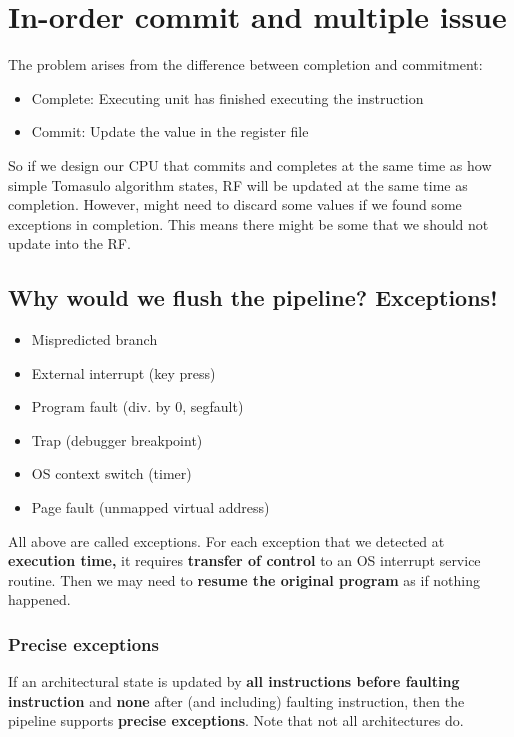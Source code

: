 \documentclass[letterpaper,12pt]{article}
\begin{document}
\section{In-order commit and multiple issue}

The problem arises from the difference between completion and commitment:
\begin{itemize}
    \item Complete: Executing unit has finished executing the instruction
    \item Commit: Update the value in the register file
\end{itemize}

So if we design our CPU that commits and completes at the same time as how simple Tomasulo algorithm states, RF will be updated at the same time as completion. However, might need to discard some values if we found some exceptions in completion. This means there might be some that we should not update into the RF.

\subsection{Why would we flush the pipeline? Exceptions!}
\begin{itemize}
    \item Mispredicted branch
    \item External interrupt (key press)
    \item Program fault (div. by 0, segfault)
    \item Trap (debugger breakpoint)
    \item OS context switch (timer)
    \item Page fault (unmapped virtual address)
\end{itemize}

All above are called exceptions. For each exception that we detected at \textbf{execution time,} it requires \textbf{transfer of control} to an OS interrupt service routine. Then we may need to \textbf{resume the original program} as if nothing happened.

\subsubsection{Precise exceptions}

If an architectural state is updated by \textbf{all instructions before faulting instruction} and \textbf{none} after (and including) faulting instruction, then the pipeline supports \textbf{precise exceptions}. Note that not all architectures do.
\end{document}
